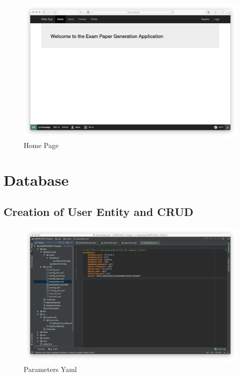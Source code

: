 \begin{figure}[htbp]
   \centering
   \includegraphics[width=400pt]{figures/homepage.png} %
   \caption{Home Page}
   \label{fig:Home Page}
\end{figure}

\section{Database}

\subsection{Creation of User Entity and CRUD}

\begin{figure}[htbp]
   \centering
   \includegraphics[width=400pt]{figures/entity_crud.png} %
   \caption{Parameters Yaml}
   \label{fig:Parameters Yaml}
\end{figure}

